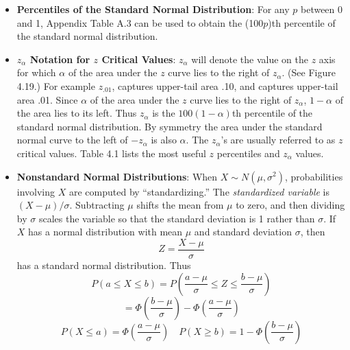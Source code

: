 \documentclass{report}
\begin{document}
\begin{itemize}
        \bigbreak \noindent 
        \bigbreak \noindent 
        \bigbreak \noindent 
    \item \textbf{Percentiles of the Standard Normal Distribution}:
        For any $p$ between 0 and 1, Appendix Table A.3 can be used to obtain the (100$p$)th percentile of the standard normal distribution.
        \pagebreak 
    \item \textbf{$z_{\alpha}$ Notation for $z$ Critical Values}:
        \( z_{\alpha} \) will denote the value on the \( z \) axis for which \( \alpha \) of the area under the \( z \) curve lies to the right of \( z_{\alpha} \). (See Figure 4.19.)
        \bigbreak \noindent 
        For example $z_{.01} $, captures upper-tail area .10, and captures upper-tail area .01.
        \bigbreak \noindent 
        \bigbreak \noindent 
        Since \( \alpha \) of the area under the \( z \) curve lies to the right of \( z_{\alpha} \), \( 1 - \alpha \) of the area lies to its left. Thus \( z_{\alpha} \) is the \( 100(1 - \alpha) \)th percentile of the standard normal distribution. By symmetry the area under the standard normal curve to the left of \( -z_{\alpha} \) is also \( \alpha \). The \( z_{\alpha} \)'s are usually referred to as \( z \) critical values. Table 4.1 lists the most useful \( z \) percentiles and \( z_{\alpha} \) values.
        \bigbreak \noindent 
    \item \textbf{Nonstandard Normal Distributions}:
        When \( X \sim N(\mu, \sigma^2) \), probabilities involving \( X \) are computed by “standardizing.” The \textit{standardized variable} is \( (X - \mu)/\sigma \). Subtracting \( \mu \) shifts the mean from \( \mu \) to zero, and then dividing by \( \sigma \) scales the variable so that the standard deviation is 1 rather than \( \sigma \).
        \bigbreak \noindent 
        If \( X \) has a normal distribution with mean \( \mu \) and standard deviation \( \sigma \), then
        \[
            Z = \frac{X - \mu}{\sigma}
        \]
        has a standard normal distribution. Thus
        \[
            P(a \leq X \leq b) = P\left( \frac{a - \mu}{\sigma} \leq Z \leq \frac{b - \mu}{\sigma} \right)
        \]
        \[
            = \Phi\left( \frac{b - \mu}{\sigma} \right) - \Phi\left( \frac{a - \mu}{\sigma} \right)
        \]
        \[
            P(X \leq a) = \Phi\left( \frac{a - \mu}{\sigma} \right) \quad P(X \geq b) = 1 - \Phi\left( \frac{b - \mu}{\sigma} \right)
\]
\end{itemize}
\end{document}
